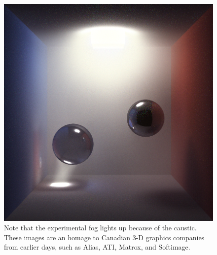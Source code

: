 \documentclass[10pt]{article}
\begin{document}
\begin{figure} 
\centering
  \includegraphics[width = 6 in]{fog4.png}
  \caption{ Note that the experimental fog lights up because of the caustic.
These images are an homage to Canadian 3-D graphics companies from earlier days, such as Alias, ATI, Matrox, and Softimage.
}
\end{figure}
\end{document}
